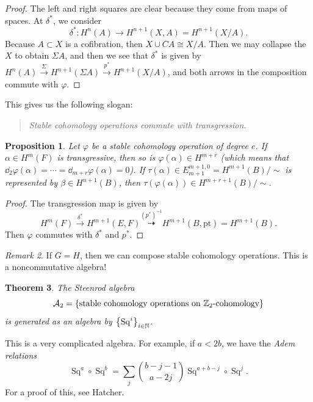\documentclass[leqno, openany]{memoir}
\newtheorem{thm}{Theorem}[section]
\newtheorem{prop}[thm]{Proposition}
\theoremstyle{definition}
\theoremstyle{remark}
\newtheorem{rmk}[thm]{Remark}
\theoremstyle{plain}
\theoremstyle{definition}
\theoremstyle{remark}
\newcommand{\Z}{\mathbb{Z}}
\newcommand{\mc}[1]{\mathcal{#1}}
\newcommand{\mr}[1]{\mathrm{#1}}
\DeclareMathOperator{\Sq}{Sq}
\begin{document}
\begin{proof} The left and right squares are clear because they come from maps
    of spaces. At $\delta^*$, we consider \[ \delta^* \colon H^n(A) \to
    H^{n+1}(X, A) = H^{n+1}(X/A). \] Because $A \subset X$ is a cofibration,
    then $X \cup C A \cong X/A$. Then we may collapse the $X$ to obtain $\Sigma
    A$, and then we see that $\delta^*$ is given by $H^n(A)
    \xrightarrow{\Sigma} H^{n+1}(\Sigma A) \xrightarrow{p^*} H^{n+1}(X/A)$, and
    both arrows in the composition commute with $\varphi$.  \end{proof}

This gives us the following slogan:

\begin{quotation} \textit{Stable cohomology operations commute with
transgression.} \end{quotation}

\begin{prop} Let $\varphi$ be a stable cohomology operation of degree $e$. If
    $\alpha \in H^m(F)$ is transgressive, then so is $\varphi(\alpha) \in
    H^{m+r}$ (which means that $\dd_2 \varphi(\alpha) = \cdots = \dd_{m+r}
    \varphi(\alpha) = 0$). If $\tau(\alpha) \in E^{m+1, 0}_{m+1} =
    H^{m+1}(B)/\sim$ is represented by $\beta \in H^{n+1}(B)$, then $\tau
    (\varphi(\alpha)) \in H^{m+r+1}(B) /\sim$.  \end{prop}

\begin{proof} The transgression map is given by \[ H^m(F)
\xrightarrow{\delta^*} H^{m+1}(E, F) \overset{{(p^*)}^{-1}}{\dashrightarrow}
H^{m+1}(B, \mr{pt}) = H^{m+1}(B). \] Then $\varphi$ commutes with $\delta^*$
and $p^*$.  \end{proof}

\begin{rmk} If $G = H$, then we can compose stable cohomology operations. This
is a noncommutative algebra!  \end{rmk}

\begin{thm} The \textit{Steenrod algebra} \[ \mc{A}_2 = \qty{\text{stable
cohomology operations on $\Z_2$-cohomology}} \] is generated as an algebra by
$\qty{\Sq^i}_{i \in \mathbb{N}}$.  \end{thm}

This is a very complicated algebra. For example, if $a < 2b$, we have the
\textit{Adem relations} \[ \Sq^a \circ \Sq^b = \sum_j \binom{b-j-1}{a-2j}
\Sq^{a+b-j} \circ \Sq^j. \] For a proof of this, see Hatcher.
\end{document}
